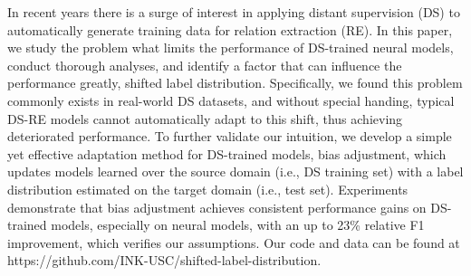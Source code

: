 In recent years there is a surge of interest in applying distant supervision (DS) to automatically generate training data for relation extraction (RE). In this paper, we study the problem what limits the performance of DS-trained neural models, conduct thorough analyses, and identify a factor that can influence the performance greatly, shifted label distribution. Specifically, we found this problem commonly exists in real-world DS datasets, and without special handing, typical DS-RE models cannot automatically adapt to this shift, thus achieving deteriorated performance. To further validate our intuition, we develop a simple yet effective adaptation method for DS-trained models, bias adjustment, which updates models learned over the source domain (i.e., DS training set) with a label distribution estimated on the target domain (i.e., test set). Experiments demonstrate that bias adjustment achieves consistent performance gains on DS-trained models, especially on neural models, with an up to 23\% relative F1 improvement, which verifies our assumptions. Our code and data can be found at https://github.com/INK-USC/shifted-label-distribution.
